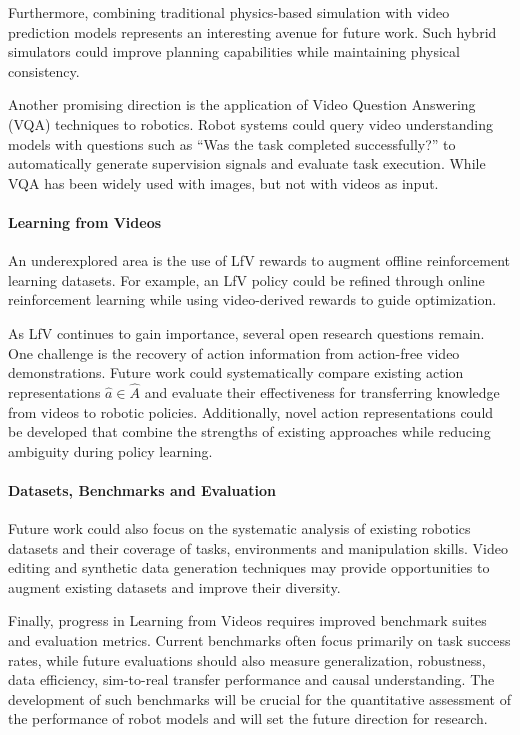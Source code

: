 Furthermore, combining traditional physics-based simulation with video prediction models represents an interesting avenue for future work. Such hybrid simulators could improve planning capabilities while maintaining physical consistency.

Another promising direction is the application of Video Question Answering (VQA) techniques to robotics. Robot systems could query video understanding models with questions such as ``Was the task completed successfully?'' to automatically generate supervision signals and evaluate task execution. While VQA has been widely used with images, but not with videos as input.



\paragraph{Learning from Videos}
An underexplored area is the use of \ac{LfV} rewards to augment offline reinforcement learning datasets. For example, an LfV policy could be refined through online reinforcement learning while using video-derived rewards to guide optimization.

As \ac{LfV} continues to gain importance, several open research questions remain. One challenge is the recovery of action information from action-free video demonstrations. Future work could systematically compare existing action representations $\hat{a} \in \hat{A}$ and evaluate their effectiveness for transferring knowledge from videos to robotic policies. Additionally, novel action representations could be developed that combine the strengths of existing approaches while reducing ambiguity during policy learning.




\paragraph{Datasets, Benchmarks and Evaluation}
Future work could also focus on the systematic analysis of existing robotics datasets and their coverage of tasks, environments and manipulation skills. Video editing and synthetic data generation techniques may provide opportunities to augment existing datasets and improve their diversity.

Finally, progress in Learning from Videos requires improved benchmark suites and evaluation metrics. Current benchmarks often focus primarily on task success rates, while future evaluations should also measure generalization, robustness, data efficiency, sim-to-real transfer performance and causal understanding. The development of such benchmarks will be crucial for the quantitative assessment of the performance of robot models and will set the future direction for research.


